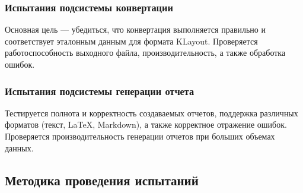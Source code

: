 \subsubsection{Испытания подсистемы конвертации}

Основная цель --- убедиться, что конвертация выполняется правильно
и соответствует эталонным данным для формата KLayout.
Проверяется работоспособность выходного файла,
производительность, а также обработка ошибок.

\subsubsection{Испытания подсистемы генерации отчета}

Тестируется полнота и корректность создаваемых отчетов,
поддержка различных форматов (текст, LaTeX, Markdown),
а также корректное отражение ошибок.
Проверяется производительность генерации отчетов при больших объемах данных.

\subsection{Методика проведения испытаний}

